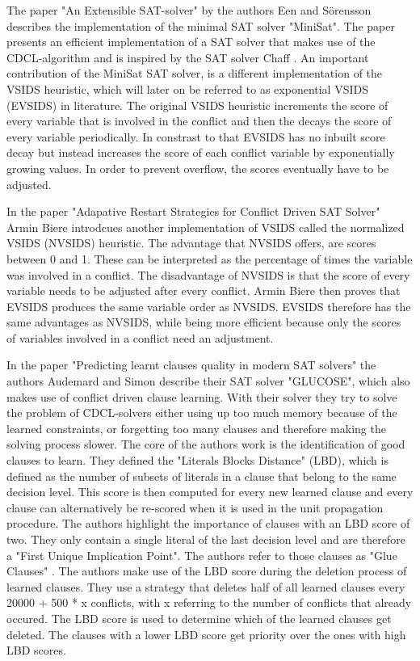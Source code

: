 \documentclass{easychair}
\begin{document}
The paper "An Extensible SAT-solver" \cite{een2003extensible} by the authors Een and Sörensson describes the implementation of the minimal SAT solver "MiniSat". The paper presents an efficient implementation of a SAT solver that makes use of the CDCL-algorithm and is inspired by the SAT solver Chaff \cite{moskewicz2001chaff}. An important contribution of the MiniSat SAT solver, is a different implementation of the VSIDS heuristic, which will later on be referred to as exponential VSIDS (EVSIDS) in literature. The original VSIDS heuristic increments the score of every variable that is involved in the conflict and then the decays the score of every variable periodically. In constrast to that EVSIDS has no inbuilt score decay but instead increases the score of each conflict variable by exponentially growing values. In order to prevent overflow, the scores eventually have to be adjusted.

In the paper "Adapative Restart Strategies for Conflict Driven SAT Solver" \cite{biere2008adaptive} Armin Biere introdcues another implementation of VSIDS called the normalized VSIDS (NVSIDS) heuristic. The advantage that NVSIDS offers, are scores between 0 and 1. These can be interpreted as the percentage of times the variable was involved in a conflict. The disadvantage of NVSIDS is that the score of every variable needs to be adjusted after every conflict. Armin Biere then proves that EVSIDS produces the same variable order as NVSIDS. EVSIDS therefore has the same advantages as NVSIDS, while being more efficient because only the scores of variables involved in a conflict need an adjustment.

In the paper "Predicting learnt clauses quality in modern SAT solvers" \cite{audemard2009predicting} the authors Audemard and Simon describe their SAT solver "GLUCOSE", which also makes use of conflict driven clause learning. With their solver they try to solve the problem of CDCL-solvers either using up too much memory because of the learned constraints, or forgetting too many clauses and therefore making the solving process slower. The core of the authors work is the identification of good clauses to learn. They defined the "Literals Blocks Distance" (LBD), which is defined as the number of subsets of literals in a clause that belong to the same decision level. This score is then computed for every new learned clause and every clause can alternatively be re-scored when it is used in the unit propagation procedure. The authors highlight the importance of clauses with an LBD score of two. They only contain a single literal of the last decision level and are therefore a "First Unique Implication Point". The authors refer to those clauses as "Glue Clauses" \cite{audemard2009predicting}. The authors make use of the LBD score during the deletion process of learned clauses. They use a strategy that deletes half of all learned clauses every 20000 + 500 * x conflicts, with x referring to the number of conflicts that already occured. The LBD score is used to determine which of the learned clauses get deleted. The clauses with a lower LBD score get priority over the ones with high LBD scores.
\end{document}
